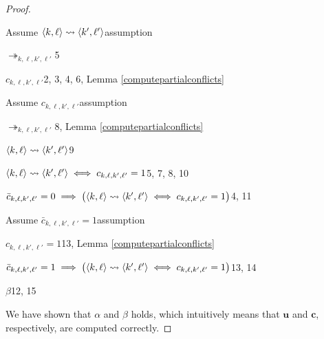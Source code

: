 \begin{proof}
\begin{enumerate}
			\item Assume $c_{k,\ell,k',\ell'}$\hfill assumption
			\item $\langle{k},{\ell}\rangle\rightsquigarrow\langle{k'},{\ell'}\rangle\iff c_{k,\ell,k',\ell'}=1$\hfill 5, 7, 8, 10
		\end{level}
		\item $\bar{c}_{k,\ell,k',\ell'}=0\implies\big(\langle{k},{\ell}\rangle\rightsquigarrow\langle{k'},{\ell'}\rangle\iff c_{k,\ell,k',\ell'}=1\big)$\hfill 4, 11
		\item Assume $\bar{c}_{k,\ell,k',\ell'}=1$\hfill assumption
		\begin{level}
			\item $c_{k,\ell,k',\ell'}=1$\hfill 13, Lemma \ref{computepartialconflicts}
		\end{level}
		\item $\bar{c}_{k,\ell,k',\ell'}=1\implies\big(\langle{k},{\ell}\rangle\rightsquigarrow\langle{k'},{\ell'}\rangle\iff c_{k,\ell,k',\ell'}=1\big)$\hfill 13, 14
		\item $\beta$\hfill 12, 15
	\end{enumerate}

	We have shown that $\alpha$ and $\beta$ holds, which intuitively means that $\mathbf{u}$ and $\mathbf{c}$, respectively, are computed correctly.
\end{proof}
